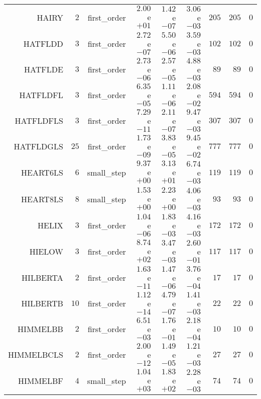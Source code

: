 \begin{longtable}{rrrrrrrrr}
HAIRY & \(     2\) & first\_order & \( 2.00\)e\(+01\) & \( 1.42\)e\(-07\) & \( 3.06\)e\(-03\) & \(   205\) & \(   205\) & \(     0\) \\
HATFLDD & \(     3\) & first\_order & \( 2.72\)e\(-07\) & \( 5.50\)e\(-06\) & \( 3.59\)e\(-03\) & \(   102\) & \(   102\) & \(     0\) \\
HATFLDE & \(     3\) & first\_order & \( 2.73\)e\(-06\) & \( 2.57\)e\(-05\) & \( 4.88\)e\(-03\) & \(    89\) & \(    89\) & \(     0\) \\
HATFLDFL & \(     3\) & first\_order & \( 6.35\)e\(-05\) & \( 1.11\)e\(-06\) & \( 2.08\)e\(-02\) & \(   594\) & \(   594\) & \(     0\) \\
HATFLDFLS & \(     3\) & first\_order & \( 7.29\)e\(-11\) & \( 2.11\)e\(-07\) & \( 9.47\)e\(-03\) & \(   307\) & \(   307\) & \(     0\) \\
HATFLDGLS & \(    25\) & first\_order & \( 1.73\)e\(-09\) & \( 3.83\)e\(-05\) & \( 9.45\)e\(-02\) & \(   777\) & \(   777\) & \(     0\) \\
HEART6LS & \(     6\) & small\_step & \( 9.37\)e\(+00\) & \( 3.13\)e\(+01\) & \( 6.74\)e\(-03\) & \(   119\) & \(   119\) & \(     0\) \\
HEART8LS & \(     8\) & small\_step & \( 1.53\)e\(+00\) & \( 2.23\)e\(+00\) & \( 4.06\)e\(-03\) & \(    93\) & \(    93\) & \(     0\) \\
HELIX & \(     3\) & first\_order & \( 1.04\)e\(-06\) & \( 1.83\)e\(-03\) & \( 4.16\)e\(-03\) & \(   172\) & \(   172\) & \(     0\) \\
HIELOW & \(     3\) & first\_order & \( 8.74\)e\(+02\) & \( 3.47\)e\(-03\) & \( 2.60\)e\(-01\) & \(   117\) & \(   117\) & \(     0\) \\
HILBERTA & \(     2\) & first\_order & \( 1.63\)e\(-11\) & \( 1.47\)e\(-06\) & \( 3.76\)e\(-04\) & \(    17\) & \(    17\) & \(     0\) \\
HILBERTB & \(    10\) & first\_order & \( 1.12\)e\(-14\) & \( 4.79\)e\(-07\) & \( 1.41\)e\(-03\) & \(    22\) & \(    22\) & \(     0\) \\
HIMMELBB & \(     2\) & first\_order & \( 6.51\)e\(-03\) & \( 1.76\)e\(-01\) & \( 2.18\)e\(-04\) & \(    10\) & \(    10\) & \(     0\) \\
HIMMELBCLS & \(     2\) & first\_order & \( 2.00\)e\(-12\) & \( 1.49\)e\(-05\) & \( 1.21\)e\(-03\) & \(    27\) & \(    27\) & \(     0\) \\
HIMMELBF & \(     4\) & small\_step & \( 1.04\)e\(+03\) & \( 1.83\)e\(+02\) & \( 2.28\)e\(-03\) & \(    74\) & \(    74\) & \(     0\) \\

\end{longtable}
